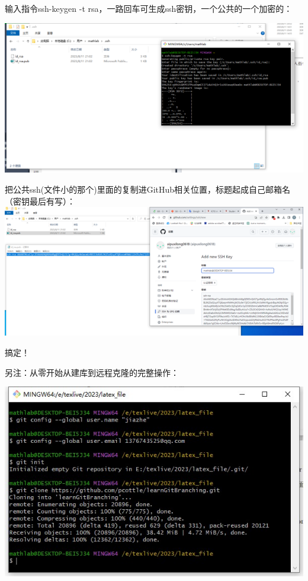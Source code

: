 \documentclass{article}
\begin{document}
输入指令ssh-keygen -t rsa，一路回车可生成ssh密钥，一个公共的一个加密的：

\includegraphics{image/10.2.png}
\begin{flushleft}
把公共ssh(文件小的那个)里面的复制进GitHub相关位置，标题起成自己邮箱名（密钥最后有写）： \includegraphics{image/10.3.png}

搞定！  

另注：从零开始从建库到远程克隆的完整操作：
\end{flushleft}

\includegraphics{image/图片1.jpg}
\end{document}
